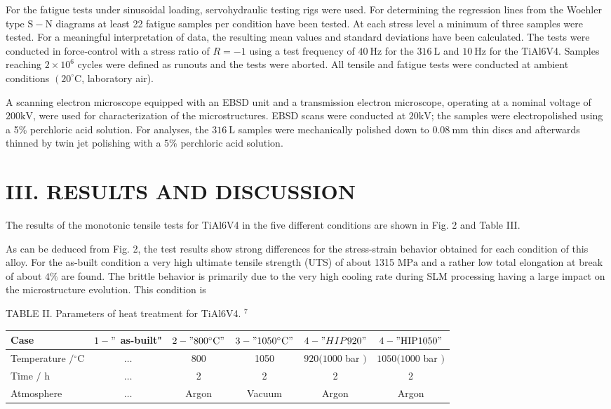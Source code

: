 \documentclass[10pt]{article}
\begin{document}
For the fatigue tests under sinusoidal loading, servohydraulic testing rigs were used. For determining the regression lines from the Woehler type $\mathrm{S}-\mathrm{N}$ diagrams at least 22 fatigue samples per condition have been tested. At each stress level a minimum of three samples were tested. For a meaningful interpretation of data, the resulting mean values and standard deviations have been calculated. The tests were conducted in force-control with a stress ratio of $R=-1$ using a test frequency of $40 \mathrm{~Hz}$ for the $316 \mathrm{~L}$ and $10 \mathrm{~Hz}$ for the TiAl6V4. Samples reaching $2 \times 10^{6}$ cycles were defined as runouts and the tests were aborted. All tensile and fatigue tests were conducted at ambient conditions $\left(20^{\circ} \mathrm{C}\right.$, laboratory air).

A scanning electron microscope equipped with an EBSD unit and a transmission electron microscope, operating at a nominal voltage of $200 \mathrm{kV}$, were used for characterization of the microstructures. EBSD scans were conducted at $20 \mathrm{kV}$; the samples were electropolished using a 5\% perchloric acid solution. For analyses, the $316 \mathrm{~L}$ samples were mechanically polished down to $0.08 \mathrm{~mm}$ thin discs and afterwards thinned by twin jet polishing with a $5 \%$ perchloric acid solution.

\section*{III. RESULTS AND DISCUSSION}
The results of the monotonic tensile tests for TiAl6V4 in the five different conditions are shown in Fig. 2 and Table III.

As can be deduced from Fig. 2, the test results show strong differences for the stress-strain behavior obtained for each condition of this alloy. For the as-built condition a very high ultimate tensile strength (UTS) of about 1315 $\mathrm{MPa}$ and a rather low total elongation at break of about $4 \%$ are found. The brittle behavior is primarily due to the very high cooling rate during SLM processing having a large impact on the microstructure evolution. This condition is

TABLE II. Parameters of heat treatment for TiAl6V4. ${ }^{7}$

\begin{center}
\begin{tabular}{lccccc}
\hline\hline
Case & $1-"$ as-built" & $2-" 800{ }^{\circ} \mathrm{C} "$ & $3-" 1050{ }^{\circ} \mathrm{C} "$ & $4-" H I P 920 "$ & $4-" \mathrm{HIP} 1050 "$ \\
\hline
Temperature $/{ }^{\circ} \mathrm{C}$ & $\ldots$ & 800 & 1050 & $920(1000$ bar $)$ & $1050(1000$ bar $)$ \\
Time $/$ h & $\ldots$ & 2 & 2 & 2 & 2 \\
Atmosphere & $\ldots$ & Argon & Vacuum & Argon & Argon \\
\hline\hline
\end{tabular}
\end{center}
\end{document}
